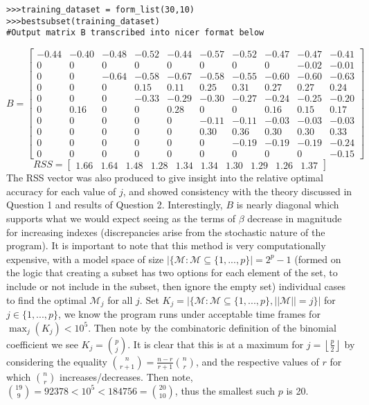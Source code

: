 \documentclass{article}
\begin{document}
\begin{lstlisting}
>>>training_dataset = form_list(30,10) 
>>>bestsubset(training_dataset)
#Output matrix B transcribed into nicer format below
\end{lstlisting}
\begin{equation*}
B= 
\begin{bmatrix}
-0.44 & -0.40 & -0.48 & -0.52 & -0.44 & -0.57 & -0.52 & -0.47 & -0.47 & -0.41 \\
0 & 0 & 0 & 0 & 0 & 0 & 0 & 0 & -0.02 & -0.01 \\
0 & 0 & -0.64 & -0.58 & -0.67 & -0.58 & -0.55 & -0.60 & -0.60 & -0.63 \\
0 & 0 & 0 & 0.15 & 0.11 & 0.25 & 0.31 & 0.27 & 0.27 & 0.24 \\
0 & 0 & 0 & -0.33 & -0.29 & -0.30 & -0.27 & -0.24 & -0.25 & -0.20 \\
0 & 0.16 & 0 & 0 & 0.28 & 0 & 0 & 0.16 & 0.15 & 0.17 \\
0 & 0 & 0 & 0 & 0 & -0.11 & -0.11 & -0.03 & -0.03 & -0.03 \\
0 & 0 & 0 & 0 & 0 & 0.30 & 0.36 & 0.30 & 0.30 & 0.33 \\
0 & 0 & 0 & 0 & 0 & 0 & -0.19 & -0.19 & -0.19 & -0.24 \\
0 & 0 & 0 & 0 & 0 & 0 & 0 & 0 & 0 & -0.15
\end{bmatrix} 
\end{equation*}
\begin{equation*}
RSS = 
\begin{bmatrix}
1.66 & 1.64 & 1.48 & 1.28 & 1.34 & 1.34 & 1.30 & 1.29 & 1.26 & 1.37
\end{bmatrix} 
\end{equation*}
The RSS vector was also produced to give insight into the relative optimal accuracy for each value of $j$, and showed consistency with the theory discussed in Question 1 and results of Question 2. Interestingly, $B$ is nearly diagonal which supports what we would expect seeing as the terms of $\beta$ decrease in magnitude for increasing indexes (discrepancies arise from the stochastic nature of the program). It is important to note that this method is very computationally expensive, with a model space of size $|\{\mathcal{M}:\mathcal{M} \subseteq \{1,...,p\}|=2^p-1$ (formed on the logic that creating a subset has two options for each element of the set, to include or not include in the subset, then ignore the empty set) individual cases to find the optimal $\mathcal{M}_j$ for all $j$. Set $K_j=|\{\mathcal{M}:\mathcal{M} \subseteq \{1,...,p\}, ||\mathcal{M}|| =j\}|$ for $j \in \{1,...,p\}$, we know the program runs under acceptable time frames for $\max_j (K_j)<10^5$. Then note by the combinatoric definition of the binomial coefficient we see $K_j = {p \choose j}$. It is clear that this is at a maximum for $j = \left \lfloor \frac{p}{2} \right \rfloor$ by considering the equality ${n\choose r+1}=\frac{n-r}{r+1} {n\choose r}$, and the respective values of $r$ for which $n\choose r$ increases/decreases. Then note, ${19\choose 9}=92378 < 10^5 < 184756 = {20\choose 10}$, thus the smallest such $p$ is 20.
\end{document}
